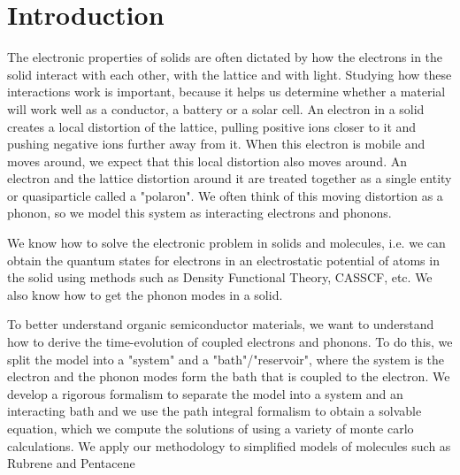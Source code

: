 \chapter{Introduction} %

\label{Chapter1} %


The electronic properties of solids are often dictated by how the electrons in the solid interact with each other, with the lattice and with light. Studying how these interactions work is important, because it helps us determine whether a material will work well as a conductor, a battery or a solar cell. An electron in a solid creates a local distortion of the lattice, pulling positive ions closer to it and pushing negative ions further away from it. When this electron is mobile and moves around, we expect that this local distortion also moves around. An electron and the lattice distortion around it are treated together as a single entity or quasiparticle called a "polaron". We often think of this moving distortion as a phonon, so we model this system as interacting electrons and phonons.

We know how to solve the electronic problem in solids and molecules, i.e. we can obtain the quantum states for electrons in an electrostatic potential of atoms in the solid using methods such as Density Functional Theory, CASSCF, etc. We also know how to get the phonon modes in a solid.

To better understand organic semiconductor materials, we want to understand how to derive the time-evolution of coupled electrons and phonons. To do this, we split the model into a "system" and a "bath"/"reservoir", where the system is the electron and the phonon modes form the bath that is coupled to the electron. We develop a rigorous formalism to separate the model into a system and an interacting bath and we use the path integral formalism to obtain a solvable equation, which we compute the solutions of using a variety of monte carlo calculations. We apply our methodology to simplified models of molecules such as Rubrene and Pentacene
